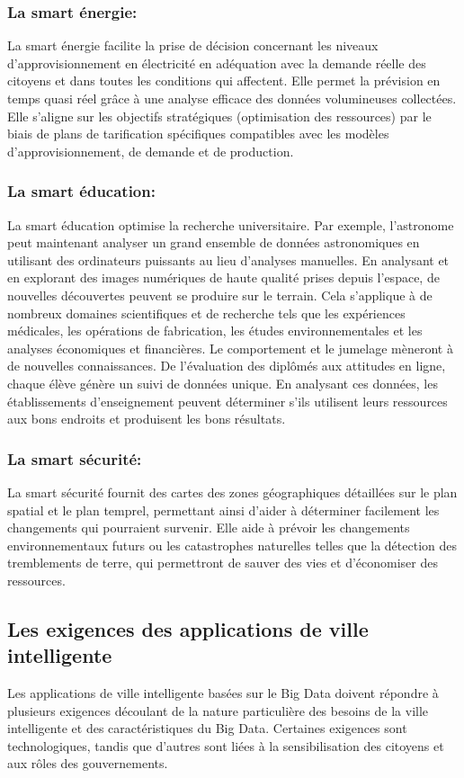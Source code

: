 \documentclass[french, a4paper, 12pt]{report}
\begin{document}
\subsubsection{La smart énergie:}
La smart énergie facilite la prise de décision concernant les niveaux d'approvisionnement en électricité en adéquation avec la demande réelle des citoyens et dans toutes les conditions qui affectent.
Elle permet la prévision en temps quasi réel grâce à une analyse efficace des données volumineuses collectées.
Elle s’aligne sur les objectifs stratégiques (optimisation des ressources) par le biais de plans de tarification spécifiques compatibles avec les modèles d'approvisionnement, de demande et de production.\\
\subsubsection{La smart éducation:}
La smart éducation optimise la recherche universitaire. Par exemple, l'astronome peut maintenant analyser un grand ensemble de données astronomiques en utilisant des ordinateurs puissants au lieu d'analyses manuelles. En analysant et en explorant des images numériques de haute qualité prises depuis l'espace, de nouvelles découvertes peuvent se produire sur le terrain. Cela s'applique à de nombreux domaines scientifiques et de recherche tels que les expériences médicales, les opérations de fabrication, les études environnementales et les analyses économiques et financières.
Le comportement et le jumelage mèneront à de nouvelles connaissances. De l'évaluation des diplômés aux attitudes en ligne, chaque élève génère un suivi de données unique. En analysant ces données, les établissements d’enseignement peuvent déterminer s’ils utilisent leurs ressources aux bons endroits et produisent les bons résultats.\\
\subsubsection{La smart sécurité:}
La smart sécurité fournit des cartes des zones géographiques détaillées sur le plan spatial et le plan temprel, permettant ainsi d’aider à déterminer facilement les changements qui pourraient survenir.
Elle aide à prévoir les changements environnementaux futurs ou les catastrophes naturelles telles que la détection des tremblements de terre, qui permettront de sauver des vies et d'économiser des ressources.\\

\subsection{Les exigences des applications de ville intelligente}
Les applications de ville intelligente basées sur le Big Data doivent répondre à plusieurs exigences découlant de la nature particulière des besoins de la ville intelligente et des caractéristiques du Big Data. Certaines exigences sont technologiques, tandis que d’autres sont liées à la sensibilisation des citoyens et aux rôles des gouvernements.\\
\end{document}
